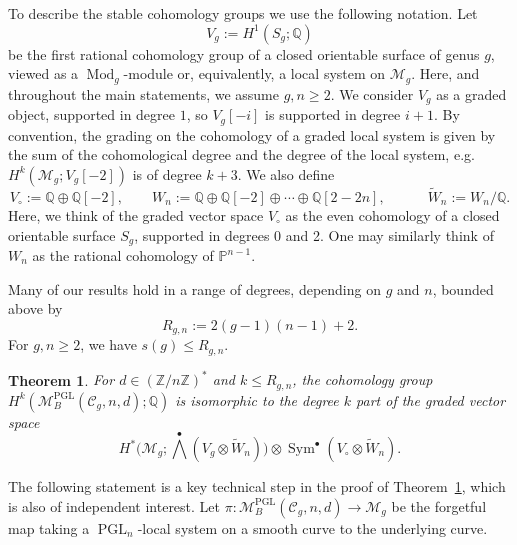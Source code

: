 \documentclass[11pt,reqno]{amsart}
\theoremstyle{plain} %
\newtheorem{theorem}{Theorem}[section]
\theoremstyle{definition}
\newcommand{\QQ}{\mathbb{Q}}
\newcommand{\PP}{\mathbb{P}}
\newcommand{\M}{\mathcal{M}}
\newcommand{\C}{\mathcal{C}}
\newcommand{\ZZ}{\mathbb{Z}}
\DeclareMathOperator{\PGL}{PGL}
\DeclareMathOperator{\Mod}{Mod}
\DeclareMathOperator{\Sym}{Sym}
\newcommand{\tW}{\widetilde{W}}
\begin{document}
To describe the stable cohomology groups we use the following notation. Let 
\begin{equation} \label{eq:Vg}
    V_g := H^1(S_g;\QQ)
\end{equation}
be the first rational cohomology group of a closed orientable surface of genus $g$, viewed as a $\Mod_g$-module or, equivalently, a local system on $\M_g$.  Here, and throughout the main statements, we assume $g,n\geq2$. We consider $V_g$ as a graded object, supported in degree $1$, so $V_g[-i]$ is supported in degree $i + 1$. By convention, the grading on the cohomology of a graded local system is given by the sum of the cohomological degree and the degree of the local system, e.g. $H^k(\M_g;V_g[-2])$ is of degree $k+3$. We also define
\begin{equation}\label{eq: grading}
V_\circ := \QQ \oplus \QQ[-2], \quad \quad W_n := \QQ \oplus \QQ[-2] \oplus \cdots \oplus \QQ[2-2n], \quad \quad %
\quad  \widetilde{W}_n := W_n / \QQ. %
\end{equation}
Here, we think of the graded vector space $V_\circ$ as the even cohomology of a closed orientable surface $S_g$, supported in degrees 0 and 2. One may similarly think of $W_n$ as the rational cohomology of $\PP^{n-1}$.

Many of our results hold in a range of degrees, depending on $g$ and $n$, bounded above by 
\begin{equation}\label{eq:tautological-range}
R_{g,n}:=2(g-1)(n-1)+2.
\end{equation}
For $g,n\geq 2$, we have $s(g)\leq R_{g,n}$.



\begin{theorem} \label{thm:mainPGL}
For $d \in (\ZZ/n\ZZ)^*$ and  $k\le R_{g,n}$, the cohomology group $H^k(\M_B^{\PGL}(\C_g, n,d); \QQ)$ is isomorphic to the degree $k$ part of the graded vector space
\begin{equation}\label{eq: PGLresult}
H^*\big(\M_g; \textstyle \bigwedge^\bullet (V_g \otimes \tW_n)\big) \otimes \Sym^\bullet (V_\circ \otimes \tW_n).
\end{equation}
\end{theorem}

The following statement is a key technical step in the proof of Theorem~\ref{thm:mainPGL}, which is also of independent interest. Let $\pi \colon \M_B^{\PGL}(\C_{g},n,d) \to \M_g$ be the forgetful map taking a $\PGL_n$-local system on a smooth curve to the underlying curve.
\end{document}
